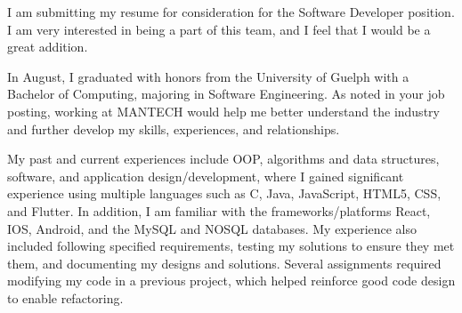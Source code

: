 \documentclass[11pt, a4paper]{awesome-cv} %
\begin{document}
\makecvheader %

\makelettertitle %


\begin{cvletter}






I am submitting my resume for consideration for the Software Developer position. I am very interested in being a part of this team, 
and I feel that I would be a great addition.

In August, I graduated with honors from the University of Guelph with a Bachelor of Computing, majoring in
Software Engineering. As noted in your job posting, working at MANTECH would help me better understand the
industry and further develop my skills, experiences, and relationships.



My past and current experiences include OOP, algorithms and data structures, software, and application
design/development, where I gained significant experience using multiple languages such as C, Java,
JavaScript, HTML5, CSS, and Flutter. In addition, I am familiar with the frameworks/platforms React, IOS,
Android, and the MySQL and NOSQL databases. My experience also included following specified
requirements, testing my solutions to ensure they met them, and documenting my designs and solutions. Several
assignments required modifying my code in a previous project, which helped reinforce good code design to
enable refactoring. 


\end{cvletter}
\end{document}
